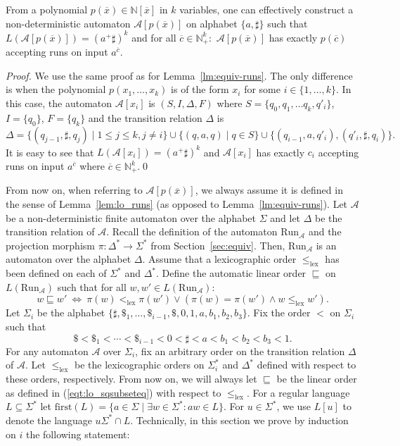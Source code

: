 \documentclass[envcountsame]{llncs}
\newcommand{\A}{\mathcal A}
\newcommand{\first}{\mathrm{first}}
\newcommand{\lex}{\mathrm{lex}}
\newcommand{\N}{\mathbb N}
\newcommand{\Run}{\mathrm{Run}}
\begin{document}
\begin{lemma}\label{lem:lo_runs}
  {}From a polynomial $p(\overline{x})\in \N[\overline{x}]$ in $k$
  variables, one can effectively construct a non-deterministic
  automaton $\A[p(\overline{x})]$ on alphabet $\{a,\sharp\}$ such that
  $L(\A[p(\overline{x})]) = (a^+\sharp)^k$ and for all
  $\overline{c}\in \N^k_+:$ $\A[p(\overline{x})]$ has exactly
  $p(\overline{c})$ accepting runs on input $a^{\overline{c}}$.
\end{lemma}

\begin{proof}
We use the same proof as for Lemma~\ref{lm:equiv-runs}. The only difference is when the polynomial 
$p(x_1,\ldots,x_k)$ is of the form $x_i$ for some $i\in \{1,\ldots,k\}$.
In this case, the automaton $\A[x_i]$ is $(S,I,\Delta,F)$ where 
$S=\{q_0,q_1,\ldots q_k,q'_i\}$, $I=\{q_0\}$, $F=\{q_k\}$ and the transition relation $\Delta$ is
\[
    \Delta =  \{(q_{j-1},\sharp,q_j)\mid 1 \leq j \leq k, j\neq i\} \cup
             \{(q,a,q)\mid q\in S\} \cup \{(q_{i-1}, a, q'_i), (q'_i,\sharp,q_{i})\} .
\]
It is easy to see that $L(\A[x_i]) = (a^+\sharp)^k$ and $\A[x_i]$ has exactly $c_i$ 
accepting runs on input $a^{\overline{c}}$ where $\overline{c}\in \N^k_+$.\qed
\end{proof}
{}From now on, when referring to $\A[p(\overline{x})]$, we always
assume it is defined in the sense of Lemma~\ref{lem:lo_runs} (as
opposed to Lemma~\ref{lm:equiv-runs}). Let $\A$ be a
non-deterministic finite automaton over the alphabet $\Sigma$ and let
$\Delta$ be the transition relation of $\A$.  Recall the definition of
the automaton $\Run_\A$ and the projection morphism $\pi : \Delta^*
\to \Sigma^*$ from Section~\ref{sec:equiv}.  Then, $\Run_\A$ is an
automaton over the alphabet $\Delta$.  Assume that a lexicographic
order $\leq_{\lex}$ has been defined on each of $\Sigma^*$ and
$\Delta^*$. Define the automatic linear order $\sqsubseteq$ on
$L(\Run_\A)$ such that for all $w,w'\in L(\Run_\A)$:
\begin{equation}\label{eqt:lo_sqsubseteq}
   w\sqsubseteq w' \ \Longleftrightarrow \ \pi(w) <_{\lex} \pi(w') \vee (\pi(w)=\pi(w') \wedge w\leq_{\lex} w').
\end{equation}
Let $\Sigma_i$ be the alphabet $\{\sharp, \$_1,\ldots, \$_{i-1}, \$, 0,1,a,b_1,b_2,b_3\}$. 
Fix the order $<$ on $\Sigma_i$ such that
\begin{equation} \label{def-alph-order}
   \$ < \$_1 < \cdots < \$_{i-1} < 0 < \sharp < a < b_1 < b_2 < b_3 < 1.
\end{equation} 
For any automaton $\A$ over $\Sigma_i$, fix an arbitrary order on the transition relation
$\Delta$ of $\A$. Let $\leq_{\lex}$ be the lexicographic orders on $\Sigma_i^*$ and $\Delta^*$ defined with respect to these orders, 
respectively. From now on, we will always let 
$\sqsubseteq$ be the linear order as defined in (\ref{eqt:lo_sqsubseteq}) with respect to $\leq_{\lex}$.
For a regular language $L \subseteq \Sigma^*$ let $\first(L) = \{ a \in
\Sigma \mid \exists w \in \Sigma^* : aw \in L \}$. 
For $u\in \Sigma^*$, we use $L[u]$ to
denote the language $u\Sigma^* \cap L$. 
Technically, in this section we prove by induction on $i$ the following statement:
\end{document}
